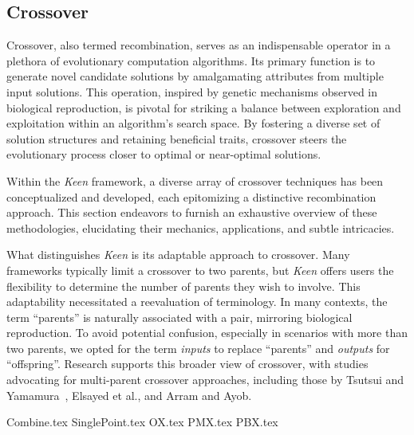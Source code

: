 \subsection{Crossover}
\label{sec:keen:op:cx}
  Crossover, also termed recombination, serves as an indispensable operator in 
  a plethora of evolutionary computation algorithms. Its primary function is to 
  generate novel candidate solutions by amalgamating attributes from multiple 
  input solutions. This operation, inspired by genetic mechanisms observed in 
  biological reproduction, is pivotal for striking a balance between 
  exploration and exploitation within an algorithm's search space. By fostering 
  a diverse set of solution structures and retaining beneficial traits, 
  crossover steers the evolutionary process closer to optimal or near-optimal 
  solutions.

  Within the \textit{Keen} framework, a diverse array of crossover techniques 
  has been conceptualized and developed, each epitomizing a distinctive 
  recombination approach. This section endeavors to furnish an exhaustive 
  overview of these methodologies, elucidating their mechanics, applications, 
  and subtle intricacies.

  What distinguishes \textit{Keen} is its adaptable approach to crossover. Many 
  frameworks typically limit a crossover to two parents, but \textit{Keen} 
  offers users the flexibility to determine the number of parents they wish to 
  involve. This adaptability necessitated a reevaluation of terminology. In 
  many contexts, the term \enquote{parents} is naturally associated with a 
  pair, mirroring biological reproduction. To avoid potential confusion, 
  especially in scenarios with more than two parents, we opted for the term 
  \textit{inputs} to replace \enquote{parents} and \textit{outputs} for 
  \enquote{offspring}. Research supports this broader view of crossover, with 
  studies advocating for multi-parent crossover approaches, including those by 
  Tsutsui and Yamamura~\autocite{tsutsuiMultiparentRecombinationSimplex1999}, 
  Elsayed et al.\autocite{elsayedGANewMultiparent2011}, and Arram and 
  Ayob\autocite{arramNovelMultiparentOrder2019}.
  
  {Combine.tex}
  {SinglePoint.tex}
  {OX.tex}
  {PMX.tex}
  {PBX.tex}
  